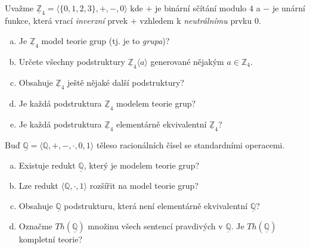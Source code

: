 \begin{problem}

    Uvažme $\underline{\mathbb{Z}}_4=\langle\{0,1,2,3\},+,-,0 \rangle$ kde $+$ je binární sčítání modulo $4$ a $-$ je unární funkce, která vrací \emph{inverzní} prvek $+$ vzhledem k \emph{neutrálnímu} prvku $0$.
    \begin{enumerate}[(a)]      
        \item Je $\underline{\mathbb{Z}}_4$ model teorie grup (tj. je to \emph{grupa})?
        \item Určete všechny podstruktury $\underline{\mathbb{Z}}_4\langle a\rangle$ generované nějakým $a\in \mathbb{Z}_4$.
        \item Obsahuje $\underline{\mathbb{Z}}_4$ ještě nějaké další podstruktury?
        \item Je každá podstruktura $\underline{\mathbb{Z}}_4$ modelem teorie grup?
        \item Je každá podstruktura $\underline{\mathbb{Z}}_4$ elementárně ekvivalentní $\underline{\mathbb{Z}}_4$?
    \end{enumerate}

    \begin{solution}
                    
    \end{solution}

\end{problem}


\begin{problem}

    Buď $\underline{\mathbb{Q}}=\langle\mathbb{Q},+,-,\cdot,0,1 \rangle$ těleso racionálních čísel se standardními operacemi.
    \begin{enumerate}[(a)]                
        \item Existuje redukt $\underline{\mathbb{Q}}$, který je modelem teorie grup?
        \item Lze redukt $\langle\mathbb{Q},\cdot,1\rangle$ rozšířit na model teorie grup?
        \item Obsahuje $\underline{\mathbb{Q}}$ podstrukturu, která není elementárně ekvivalentní $\underline{\mathbb{Q}}$?
        \item Označme $Th(\underline{\mathbb{Q}})$ množinu všech sentencí pravdivých v $\underline{\mathbb{Q}}$. Je $Th(\underline{\mathbb{Q}})$ kompletní teorie?
    \end{enumerate}

    \begin{solution}
                    
    \end{solution}

\end{problem}



